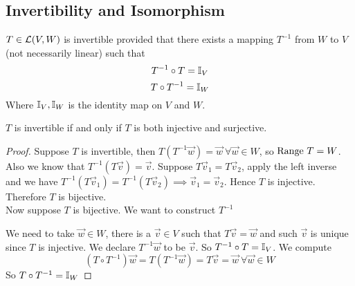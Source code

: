 \subsection{Invertibility and Isomorphism}
\begin{center}
\end{center}
\begin{definition}
    $T \in \mathcal L(V,W)$ is invertible provided that there exists a mapping $T^{-1}$ from $W$ to $V$ (not necessarily linear) such that \[ T^{-1} \circ T = \mathbb I_V\]
    \[ T \circ T^{-1} = \mathbb I_W\]
    Where $\mathbb I_{V}, \mathbb I_W$ is the identity map on $V$ and $W$.
\end{definition}
\begin{theorem}
    $T$ is invertible if and only if $T$ is both injective and surjective.
\end{theorem}
\begin{proof}
    Suppose $T$ is invertible, then $T(T^{-1} \vec w) = \vec w \ \forall \vec w \in W$, so $\text{Range } T = W$. Also we know that $T^{-1}(T \vec v) = \vec v$. Suppose $T\vec v_1 =T\vec v_2$, apply the left inverse and we have $T^{-1} (T\vec v_1) = T^{-1} (T\vec v_2) \implies \vec v_1 = \vec v_2$. Hence $T$ is injective. Therefore $T$ is bijective. \\
    Now suppose $T$ is bijective. We want to construct $T^{-1}$
    \begin{center}
\end{center}
We need to take $\vec w \in W$, there is a $\vec v \in V$ such that $T\vec v = \vec w$ and such $\vec v$ is unique since $T$ is injective. We declare $T^{-1}\vec w$ to be $\vec v$. So $T^{-1} \circ T = \mathbb I_{V}$. We compute \[ (T \circ T^{-1}) \vec w = T(T^{-1} \vec w) = T\vec v = \vec w \ \forall  \vec w \in W\] So $T \circ T^{-1} = \mathbb I_W$ 
\end{proof}
